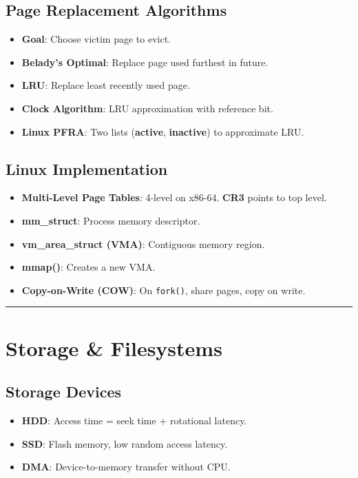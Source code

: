 \documentclass[8pt,a4paper]{article}
\newcommand{\sectiondivider}{\vspace{4pt}\hrule\vspace{4pt}}
\begin{document}
\begin{multicols}{2}
\subsection*{Page Replacement Algorithms}
\begin{itemize}
    \item \textbf{Goal}: Choose victim page to evict.
    \item \textbf{Belady's Optimal}: Replace page used furthest in future.
    \item \textbf{LRU}: Replace least recently used page.
    \item \textbf{Clock Algorithm}: LRU approximation with reference bit.
    \item \textbf{Linux PFRA}: Two lists (\textbf{active}, \textbf{inactive}) to approximate LRU.
\end{itemize}

\subsection*{Linux Implementation}
\begin{itemize}
    \item \textbf{Multi-Level Page Tables}: 4-level on x86-64. \textbf{CR3} points to top level.
    \item \textbf{mm\_struct}: Process memory descriptor.
    \item \textbf{vm\_area\_struct (VMA)}: Contiguous memory region.
    \item \textbf{mmap()}: Creates a new VMA.
    \item \textbf{Copy-on-Write (COW)}: On \texttt{fork()}, share pages, copy on write.
\end{itemize}

\sectiondivider
\section*{Storage \& Filesystems}
\subsection*{Storage Devices}
\begin{itemize}
    \item \textbf{HDD}: Access time = seek time + rotational latency.
    \item \textbf{SSD}: Flash memory, low random access latency.
    \item \textbf{DMA}: Device-to-memory transfer without CPU.
\end{itemize}


\end{multicols}
\end{document}
